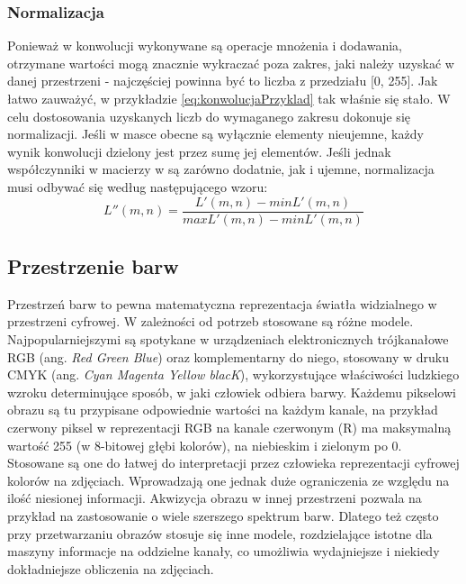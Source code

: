 \subsubsection{Normalizacja}
Ponieważ w konwolucji wykonywane są operacje mnożenia i dodawania, otrzymane wartości mogą znacznie wykraczać poza zakres, jaki należy uzyskać w danej przestrzeni - najczęściej powinna być to liczba z przedziału [0, 255]. Jak łatwo zauważyć, w przykładzie \ref{eq:konwolucjaPrzyklad} tak właśnie się stało. W celu dostosowania uzyskanych liczb do wymaganego zakresu dokonuje się normalizacji. Jeśli w masce obecne są wyłącznie elementy nieujemne, każdy wynik konwolucji dzielony jest przez sumę jej elementów. Jeśli jednak współczynniki w macierzy w są zarówno dodatnie, jak i ujemne, normalizacja musi odbywać się według następującego wzoru:
\begin{equation}
L''(m,n) = \dfrac{L'(m,n)-minL'(m,n)}{maxL'(m,n)-minL'(m,n)}
\end{equation}
\subsection{Przestrzenie barw}
\label{sec:colorSpace}
Przestrzeń barw to pewna matematyczna reprezentacja światła widzialnego w przestrzeni cyfrowej. W zależności od potrzeb stosowane są różne modele. Najpopularniejszymi są spotykane w urządzeniach elektronicznych trójkanałowe RGB (ang. \textit{Red Green Blue}) oraz komplementarny do niego, stosowany w druku CMYK (ang. \textit{Cyan Magenta Yellow blacK}), wykorzystujące właściwości ludzkiego wzroku determinujące sposób, w jaki człowiek odbiera barwy. Każdemu pikselowi obrazu są tu przypisane odpowiednie wartości na każdym kanale, na przykład czerwony piksel w reprezentacji RGB na kanale czerwonym (R) ma maksymalną wartość 255 (w 8-bitowej głębi kolorów), na niebieskim i zielonym po 0. Stosowane są one do łatwej do interpretacji przez człowieka reprezentacji cyfrowej kolorów na zdjęciach. Wprowadzają one jednak duże ograniczenia ze względu na ilość niesionej informacji. Akwizycja obrazu w innej przestrzeni pozwala na przykład na zastosowanie o wiele szerszego spektrum barw. Dlatego też często przy przetwarzaniu obrazów stosuje się inne modele, rozdzielające istotne dla maszyny informacje na oddzielne kanały, co umożliwia wydajniejsze i niekiedy dokładniejsze obliczenia na zdjęciach.
